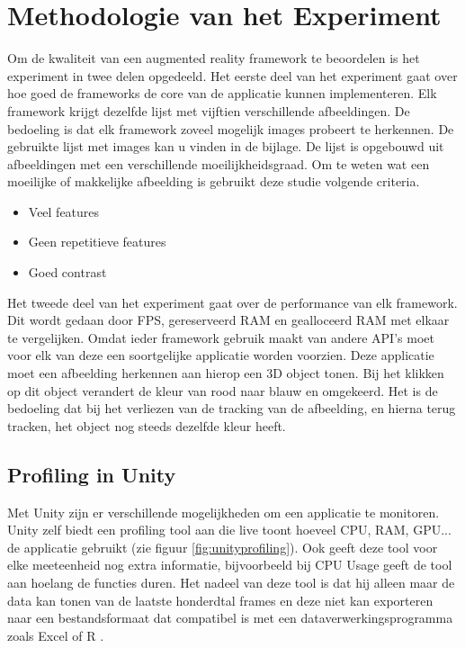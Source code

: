 
\chapter{Methodologie van het Experiment}
\label{ch:methodologie}

Om de kwaliteit van een augmented reality framework te beoordelen is het experiment in twee delen opgedeeld. Het eerste deel van het experiment gaat over hoe goed de frameworks de core van de applicatie kunnen implementeren. Elk framework krijgt dezelfde lijst met vijftien verschillende afbeeldingen. De bedoeling is dat elk framework zoveel mogelijk images probeert te herkennen. De gebruikte lijst met images kan u vinden in de bijlage. De lijst is opgebouwd uit afbeeldingen met een verschillende moeilijkheidsgraad. Om te weten wat een moeilijke of makkelijke afbeelding is gebruikt deze studie volgende criteria.

\begin{itemize}
    \item Veel features
    \item Geen repetitieve features
    \item Goed contrast
\end{itemize} 


Het tweede deel van het experiment gaat over de performance van elk framework. Dit wordt gedaan door FPS, gereserveerd RAM en gealloceerd RAM met elkaar te vergelijken. Omdat ieder framework gebruik maakt van andere API's moet voor elk van deze een soortgelijke applicatie worden voorzien. Deze applicatie moet een afbeelding herkennen aan hierop een 3D object tonen. Bij het klikken op dit object verandert de kleur van rood naar blauw en omgekeerd. Het is de bedoeling dat bij het verliezen van de tracking van de afbeelding, en hierna terug tracken, het object nog steeds dezelfde kleur heeft.

\section{Profiling in Unity}
Met Unity zijn er verschillende mogelijkheden om een applicatie te monitoren. Unity zelf biedt een profiling tool aan die live toont hoeveel CPU, RAM, GPU... de applicatie gebruikt (zie figuur \ref{fig:unityprofiling}). Ook geeft deze tool voor elke meeteenheid nog extra informatie, bijvoorbeeld bij CPU Usage geeft de tool aan hoelang de functies duren. Het nadeel van deze tool is dat hij alleen maar de data kan tonen van de laatste honderdtal frames en deze niet kan exporteren naar een bestandsformaat dat compatibel is met een dataverwerkingsprogramma zoals Excel of R \autocite{UnityProfiling}.

